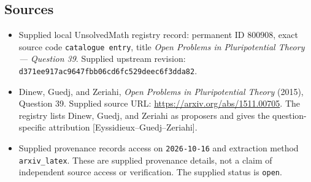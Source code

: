 \documentclass[11pt]{article}
\begin{document}
\subsection{Sources}
\begin{itemize}
\item Supplied local UnsolvedMath registry record: permanent ID \(800908\), exact source code \texttt{catalogue entry}, title \emph{Open Problems in Pluripotential Theory --- Question 39}. Supplied upstream revision: \texttt{d371ee917ac9647fbb06cd6fc529deec6f3dda82}.
\item Dinew, Guedj, and Zeriahi, \emph{Open Problems in Pluripotential Theory} (2015), Question 39. Supplied source URL: \url{https://arxiv.org/abs/1511.00705}. The registry lists Dinew, Guedj, and Zeriahi as proposers and gives the question-specific attribution \textnormal{[Eyssidieux--Guedj--Zeriahi]}.
\item Supplied provenance records access on \texttt{2026-10-16} and extraction method \texttt{arxiv\_latex}. These are supplied provenance details, not a claim of independent source access or verification. The supplied status is \texttt{open}.
\end{itemize}
\end{document}
